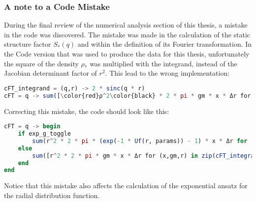 \subsubsection*{A note to a Code Mistake}
During the final review of the numerical analysis section of this thesis, a mistake in the code was discovered. The mistake was made in the calculation of the static structure factor $S_*(q)$ and within the definition of its Fourier transformation. In the Code version that was used to produce the data for this thesis, unfortunately the square of the density $\rho_*$ was multiplied with the integrand, instead of the Jacobian determinant factor of $r^2$. This lead to the wrong implementation:
\begin{mdframed}[backgroundcolor=black!4, topline=false, bottomline=false, rightline=false, leftline=false]
    \begin{lstlisting}[language=Julia,basicstyle=\small]
cFT_integrand = (q,r) -> 2 * sinc(q * r)
cFT = q -> sum([\color{red}ρ^2\color{black} * 2 * pi * gm * x * Δr for (x,gm) in zip(cFT_integrand.(q, solution.r),[x - 1 for x in solution.gr])])
    \end{lstlisting}
\end{mdframed}
Correcting this mistake, the code should look like this:
\begin{mdframed}[backgroundcolor=black!4, topline=false, bottomline=false, rightline=false, leftline=false]
    \begin{lstlisting}[language=Julia,basicstyle=\small]
cFT = q -> begin
	if exp_g_toggle
		sum(r^2 * 2 * pi * (exp(-1 * Uf(r, params)) - 1) * x * Δr for (x,r) in zip(cFT_integrand.(q, solution.r),solution.r))
	else 
		sum([r^2 * 2 * pi * gm * x * Δr for (x,gm,r) in zip(cFT_integrand.(q, solution.r),[x - 1 for x in solution.gr],solution.r)]) # use cFT_integrand on all r values from solution.r, then discretely integr.
	end
end
    \end{lstlisting}
\end{mdframed}
Notice that this mistake also affects the calculation of the exponential ansatz for the radial distribution function. 

